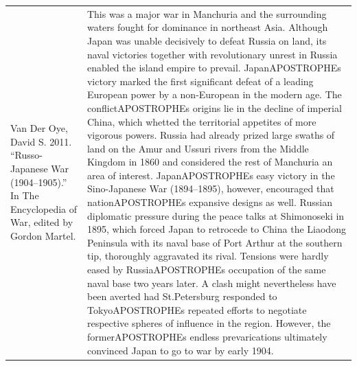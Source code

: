 {\begin{longtable}{p{}p{}}
\\
Van Der Oye, David S. 2011. “Russo-Japanese War (1904–1905).” In The Encyclopedia of War, edited by Gordon Martel. & This was a major war in Manchuria and the surrounding waters fought for dominance in northeast Asia. Although Japan was unable decisively to defeat Russia on land, its naval victories together with revolutionary unrest in Russia enabled the island empire to prevail. JapanAPOSTROPHEs victory marked the first significant defeat of a leading European power by a non-European in the modern age. The conflictAPOSTROPHEs origins lie in the decline of imperial China, which whetted the territorial appetites of more vigorous powers. Russia had already prized large swaths of land on the Amur and Ussuri rivers from the Middle Kingdom in 1860 and considered the rest of Manchuria an area of interest. JapanAPOSTROPHEs easy victory in the Sino-Japanese War (1894–1895), however, encouraged that nationAPOSTROPHEs expansive designs as well.  Russian diplomatic pressure during the peace talks at Shimonoseki in 1895, which forced Japan to retrocede to China the Liaodong Peninsula with its naval base of Port Arthur at the southern tip, thoroughly aggravated its rival. Tensions were hardly eased by RussiaAPOSTROPHEs occupation of the same naval base two years later. A clash might nevertheless have been averted had St.Petersburg responded to TokyoAPOSTROPHEs repeated efforts to negotiate respective spheres of influence in the region. However, the formerAPOSTROPHEs endless prevarications ultimately convinced Japan to go to war by early 1904.
\\

\end{longtable}}
